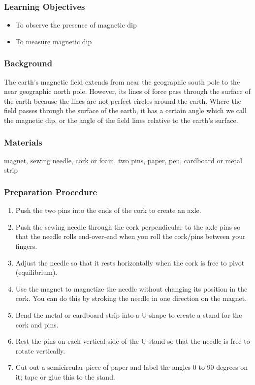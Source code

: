 \subsubsection*{Learning Objectives}
\begin{itemize}
\item{To observe the presence of magnetic dip}
\item{To measure magnetic dip}
\end{itemize}

\subsubsection*{Background}
The earth's magnetic field extends from near the geographic south pole to the near geographic north pole.  However, its lines of force pass through the surface of the earth because the lines are not perfect circles around the earth.  Where the field passes through the surface of the earth, it has a certain angle which we call the magnetic dip, or the angle of the field lines relative to the earth's surface.

\subsubsection*{Materials}
magnet, sewing needle, cork or foam, two pins, paper, pen, cardboard or metal strip

\subsubsection*{Preparation Procedure}
\begin{enumerate}
\item{Push the two pins into the ends of the cork to create an axle.}
\item{Push the sewing needle through the cork perpendicular to the axle pins so that the needle rolls end-over-end when you roll the cork/pins between your fingers.}
\item{Adjust the needle so that it rests horizontally when the cork is free to pivot (equilibrium).}
\item{Use the magnet to magnetize the needle without changing its position in the cork.  You can do this by stroking the needle in one direction on the magnet.}
\item{Bend the metal or cardboard strip into a U-shape to create a stand for the cork and pins.}
\item{Rest the pins on each vertical side of the U-stand so that the needle is free to rotate vertically.}
\item{Cut out a semicircular piece of paper and label the angles 0 to 90 degrees on it; tape or glue this to the stand.}
\end{enumerate}

